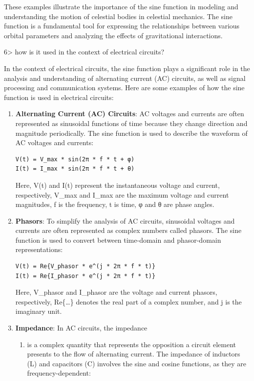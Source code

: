 \documentclass[
]{article}
\providecommand{\tightlist}{%
  \setlength{\itemsep}{0pt}\setlength{\parskip}{0pt}}
\begin{document}
These examples illustrate the importance of the sine function in
modeling and understanding the motion of celestial bodies in celestial
mechanics. The sine function is a fundamental tool for expressing the
relationships between various orbital parameters and analyzing the
effects of gravitational interactions.

6\textgreater{} how is it used in the context of electrical circuits?

In the context of electrical circuits, the sine function plays a
significant role in the analysis and understanding of alternating
current (AC) circuits, as well as signal processing and communication
systems. Here are some examples of how the sine function is used in
electrical circuits:

\begin{enumerate}
\def\labelenumi{\arabic{enumi}.}
\item
  \textbf{Alternating Current (AC) Circuits}: AC voltages and currents
  are often represented as sinusoidal functions of time because they
  change direction and magnitude periodically. The sine function is used
  to describe the waveform of AC voltages and currents:

\begin{verbatim}
V(t) = V_max * sin(2π * f * t + φ)
I(t) = I_max * sin(2π * f * t + θ)
\end{verbatim}

  Here, V(t) and I(t) represent the instantaneous voltage and current,
  respectively, V\_max and I\_max are the maximum voltage and current
  magnitudes, f is the frequency, t is time, φ and θ are phase angles.
\item
  \textbf{Phasors}: To simplify the analysis of AC circuits, sinusoidal
  voltages and currents are often represented as complex numbers called
  phasors. The sine function is used to convert between time-domain and
  phasor-domain representations:

\begin{verbatim}
V(t) = Re{V_phasor * e^(j * 2π * f * t)}
I(t) = Re{I_phasor * e^(j * 2π * f * t)}
\end{verbatim}

  Here, V\_phasor and I\_phasor are the voltage and current phasors,
  respectively, Re\{\ldots\} denotes the real part of a complex number,
  and j is the imaginary unit.
\item
  \textbf{Impedance}: In AC circuits, the impedance

  \begin{enumerate}
  \def\labelenumii{(\Alph{enumii})}
  \setcounter{enumii}{25}
  \tightlist
  \item
    is a complex quantity that represents the opposition a circuit
    element presents to the flow of alternating current. The impedance
    of inductors (L) and capacitors (C) involves the sine and cosine
    functions, as they are frequency-dependent:
  \end{enumerate}


\end{enumerate}
\end{document}
